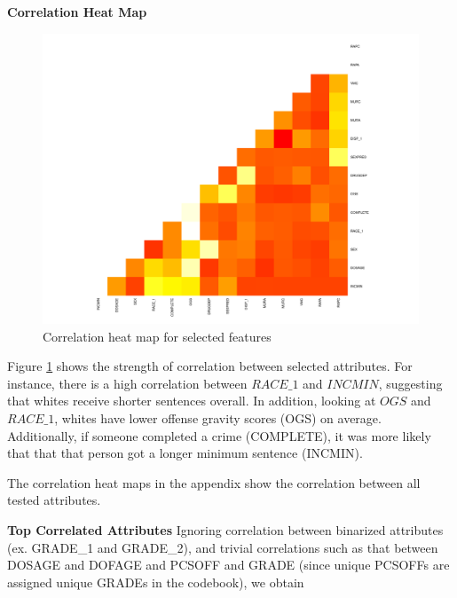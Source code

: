 \documentclass[11pt,letter]{article}
\begin{document}
\textbf{Correlation Heat Map}
\begin{figure}
	\centering
	\includegraphics[scale=0.35]{report_figures/cool.pdf}
	\caption{Correlation heat map for selected features}
	\label{corr_heat_map}
\end{figure}
Figure \ref{corr_heat_map} shows the strength of correlation between selected attributes. For instance, there is a high correlation between $RACE\_1$ and $INCMIN$, suggesting that whites receive shorter sentences overall. In addition, looking at $OGS$ and $RACE\_1$, whites have lower offense gravity scores (OGS) on average. Additionally, if someone completed a crime (COMPLETE), it was more likely that that that person got a longer minimum sentence (INCMIN).

The correlation heat maps in the appendix show the correlation between all tested attributes.

\textbf{Top Correlated Attributes}
Ignoring correlation between binarized attributes (ex. GRADE\_1 and GRADE\_2), 
and trivial correlations such as that between DOSAGE and DOFAGE and PCSOFF and GRADE (since unique PCSOFFs are assigned unique GRADEs in the codebook), we obtain
\end{document}
